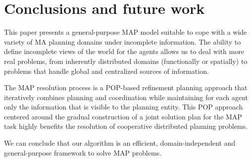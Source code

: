 \documentclass[12pt]{article}
\begin{document}
\section{Conclusions and future work}

This paper presents a general-purpose MAP model suitable to cope with a wide variety of MA planning domains under incomplete information.
The ability to define incomplete views of the world for the agents allows us to deal with more real problems, from inherently distributed domains (functionally or spatially) to problems that handle global and centralized sources of information.

The MAP resolution process is a POP-based refinement planning approach that iteratively combines planning and coordination while maintaining for each agent only the information that is visible to the planning entity.
This POP approach centered around the gradual construction of a joint solution plan for the MAP task highly benefits the resolution of cooperative distributed planning problems.

We can conclude that our algorithm is an efficient, domain-independent and general-purpose framework to solve MAP problems.

\newpage
\printbibliography
\end{document}
